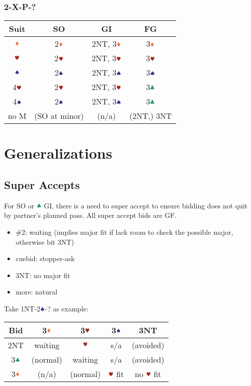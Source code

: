 \documentclass{article}
\begin{document}
\begin{multicols}{2}
\subsubsection{2\CCC-X-P-?}
\begin{tabular}{c|c|c|c}
    \hline
    Suit & SO & GI & FG \\ \hline\hline
    $\ddd$ & 2$\ddd$ & 2NT, 3$\ddd$ & 3$\ddd$ \\ \hline
    $\hhh$ & 2$\hhh$ & 2NT, 3$\hhh$ & 3$\hhh$ \\ \hline
    $\sss$ & 2$\sss$ & 2NT, 3$\sss$ & 3$\sss$ \\ \hline
    4$\hhh$ & 2$\hhh$ & 2NT, 3$\hhh$ & 3$\ccc$ \\ \hline
    4$\sss$ & 2$\sss$ & 2NT, 3$\sss$ & 3$\ccc$ \\ \hline
    no M & (SO at minor) & (n/a) & (2NT,) 3NT \\ \hline
\end{tabular}

\section{Generalizations}
\subsection{Super Accepts}
For SO or $\ccc$ GI, there is a need to super accept to ensure bidding does not quit by partner's planned pass. All super accept bids are GF.
\begin{itemize}
    \item \#2: waiting (implies major fit if lack room to check the possible major, otherwise bit 3NT)
    \item cuebid: stopper-ask
    \item 3NT: no major fit
    \item more: natural
\end{itemize}

\noindent Take 1NT-2$\sss$-? as example: \\
\begin{tabular}{c|c|c|c|c}
    \hline
    Bid & 3$\ddd$ & 3$\hhh$ & 3$\sss$ & 3NT \\ \hline\hline
    2NT & waiting & $\hhh$ & s/a & (avoided) \\ \hline
    3$\ccc$ & (normal) & waiting & s/a & (avoided) \\ \hline
    3$\ddd$ & (n/a) & (normal) & $\hhh$ fit & no $\hhh$ fit \\ \hline
\end{tabular}


\end{multicols}
\end{document}
